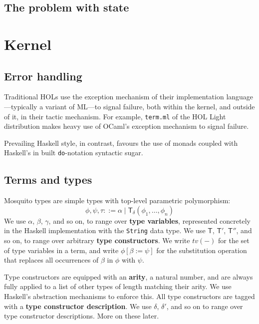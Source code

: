 \documentclass{llncs}
\newcommand{\deffont}[1]{\textbf{#1}}
\newcommand{\tf}[1]{\mathsf{#1}}
\begin{document}
\subsection{The problem with state}
\label{subsect.problem.with.state}

\section{Kernel}
\label{sect.kernel}

\subsection{Error handling}
\label{subsect.error.handling}

Traditional HOLs use the exception mechanism of their implementation language---typically a variant of ML---to signal failure, both within the kernel, and outside of it, in their tactic mechanism.
For example, \texttt{term.ml} of the HOL Light distribution makes heavy use of OCaml's exception mechanism to signal failure.

Prevailing Haskell style, in contrast, favours the use of monads coupled with Haskell's in built \texttt{do}-notation syntactic sugar.

\subsection{Terms and types}
\label{subsect.terms.and.types}

Mosquito types are simple types with top-level parametric polymorphism:
\begin{displaymath}
\phi, \psi, \tau ::= \alpha \mid \tf{T}_\delta(\phi_1, \ldots, \phi_n)
\end{displaymath}
We use $\alpha$, $\beta$, $\gamma$, and so on, to range over \deffont{type variables}, represented concretely in the Haskell implementation with the \texttt{String} data type.
We use $\tf{T}$, $\tf{T}'$, $\tf{T}''$, and so on, to range over arbitrary \deffont{type constructors}.
We write $tv(-)$ for the set of type variables in a term, and write $\phi[\beta := \psi]$ for the substitution operation that replaces all occurrences of $\beta$ in $\phi$ with $\psi$.

Type constructors are equipped with an \deffont{arity}, a natural number, and are always fully applied to a list of other types of length matching their arity.
We use Haskell's abstraction mechanisms to enforce this.
All type constructors are tagged with a \deffont{type constructor description}.
We use $\delta$, $\delta'$, and so on to range over type constructor descriptions.
More on these later.
\end{document}
